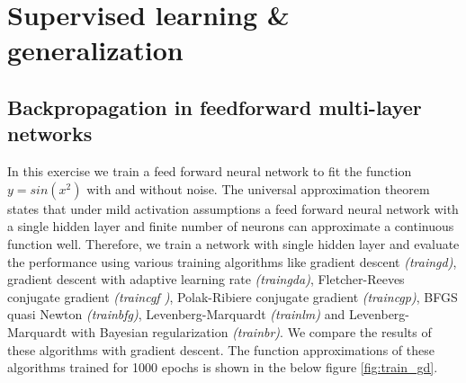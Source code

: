 \chapter{Supervised learning \& generalization}
\section{Backpropagation in feedforward multi-layer networks}
In this exercise we train a feed forward neural network to fit the function $y = sin(x^2)$ with and without noise. The universal approximation theorem states that under mild activation assumptions a feed forward neural network with a single hidden layer and finite number of neurons can approximate a continuous function well. Therefore, we train a network with single hidden layer and evaluate the performance using various training algorithms like gradient descent \textit{(traingd)}, gradient descent with adaptive learning rate \textit{(traingda)}, Fletcher-Reeves conjugate gradient \textit{(traincgf )}, Polak-Ribiere
conjugate gradient \textit{(traincgp)}, BFGS quasi Newton \textit{(trainbfg)}, Levenberg-Marquardt \textit{(trainlm)} and Levenberg-Marquardt with Bayesian regularization \textit{(trainbr)}. We compare the results of these algorithms with gradient descent. The function approximations of these algorithms trained for 1000 epochs is shown in the below figure \ref{fig:train_gd}. 
